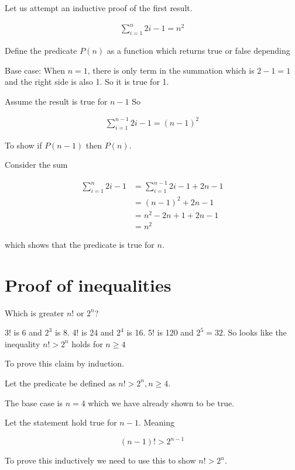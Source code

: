 \documentclass[12pt]{article}
\begin{document}
Let us attempt an inductive proof of the first result.

\begin{align*}
\sum_{i=1}^n 2i - 1 = n^2
\end{align*}

Define the predicate $P(n)$ as a function which returns true or false depending 

Base case: When $n=1$, there is only term in the summation which is $ 2 - 1 = 1$ and the right side is also 1. So it is true for 1.

Assume the result is true for $n-1$ So 

\begin{align*}
\sum_{i=1}^{n-1} 2i - 1 = (n-1)^2
\end{align*}

To show if $P(n-1)$ then $P(n)$.

Consider the sum 

\begin{align*}
\sum_{i=1}^n 2i - 1 &= \sum_{i=1}^{n-1} 2i - 1 + 2n - 1 \\
&= (n-1)^2 + 2n - 1 \tag{using P(n-1) true}\\
&= n^2 - 2n + 1 + 2n - 1 \\
&= n^2
\end{align*}

which shows that the predicate is true for $n$.

\section*{Proof of inequalities}

Which is greater $n!$ or $2^n$? 

3! is 6 and $2^3$ is 8. 4! is 24 and $2^4$ is 16. 5! is 120 and $2^5=32$. So looks like the inequality $n! > 2^n$ holds for $n \ge 4$

To prove this claim by induction.

Let the predicate be defined as $n! > 2^n, n \ge 4$.

The base case is $n = 4$ which we have already shown to be true.

Let the statement hold true for $n-1$. Meaning 

\begin{equation} \label{eq:prop}
(n-1)! > 2^{n-1}
\end{equation}

To prove this inductively we need to use this to show $n! > 2^n$.
\end{document}
